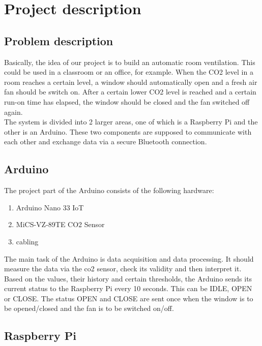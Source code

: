 \section{Project description}
\label{chapter1}

\subsection{Problem description}

Basically, the idea of our project is to build an automatic room ventilation. This could be used in a classroom or an office, for example. When the CO2 level in a room reaches a certain level, a window should automatically open and a fresh air fan should be switch on. After a certain lower CO2 level is reached and a certain run-on time has elapsed, the window should be closed and the fan switched off again.\\

The system is divided into 2 larger areas, one of which is a Raspberry Pi and the other is an Arduino. These two components are supposed to communicate with each other and exchange data via a secure Bluetooth connection. 

\subsection{Arduino}

The project part of the Arduino consists of the following hardware:

\begin{enumerate}[label*=\arabic*.]
    \item \label{hw.1} Arduino Nano 33 IoT 
    \item \label{hw.2} MiCS-VZ-89TE CO2 Sensor
    \item \label{hw.3} cabling
\end{enumerate}

The main task of the Arduino is data acquisition and data processing. It should measure the data via the co2 sensor, check its validity and then interpret it. Based on the values, their history and certain thresholds, the Arduino sends its current status to the Raspberry Pi every 10 seconds. This can be IDLE, OPEN or CLOSE. The status OPEN and CLOSE are sent once when the window is to be opened/closed and the fan is to be switched on/off.

\subsection{Raspberry Pi}

